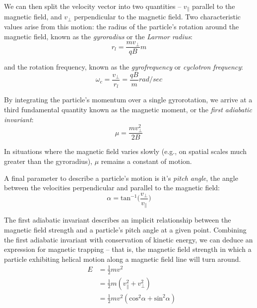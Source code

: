 We can then split the velocity vector into two quantities -- $v_\parallel$ parallel to the magnetic field, and $v_\perp$ perpendicular to the magnetic field. Two characteristic values arise from this motion: the radius of the particle's rotation around the magnetic field, known as the \emph{gyroradius} or the \emph{Larmor radius}:
\begin{equation}
r_l = \frac{m v_\perp}{qB} \unit{m}
\end{equation}

\noindent and the rotation frequency, known as the \emph{gyrofrequency} or \emph{cyclotron frequency}:
\begin{equation}
\omega_c = \frac{v_\perp}{r_l} = \frac{q B}{m} \unit{rad/sec}
\end{equation}

\noindent By integrating the particle's momentum over a single gyrorotation, we arrive at a third fundamental quantity known as the magnetic moment, or the \emph{first adiabatic invariant}:
\begin{equation}
\mu = \frac{m v_\perp^2}{2B}
\label{eqn:first_adiabatic_invariant}
\end{equation}

\noindent In situations where the magnetic field varies slowly (e.g., on spatial scales much greater than the gyroradius), $\mu$ remains a constant of motion.

A final parameter to describe a particle's motion is it's \emph{pitch angle}, the angle between the velocities perpendicular and parallel to the magnetic field:
\begin{equation}
\alpha = \mathrm{tan}^{-1}\bigg(\frac{v_\perp}{v_\parallel}\bigg)
\end{equation}

The first adiabatic invariant describes an implicit relationship between the magnetic field strength and a particle's pitch angle at a given point. 
Combining the first adiabatic invariant with conservation of kinetic energy, we can deduce an expression for magnetic trapping -- that is, the magnetic field strength in which a particle exhibiting helical motion along a magnetic field line will turn around. 
\begin{eqnarray}
& E &= \frac{1}{2}mv^2 \\
& &= \frac{1}{2}m(v_\parallel^2 + v_\perp^2) \\
 & &= \frac{1}{2}mv^2(\mathrm{cos}^2\alpha + \mathrm{sin}^2\alpha)
\end{eqnarray}

